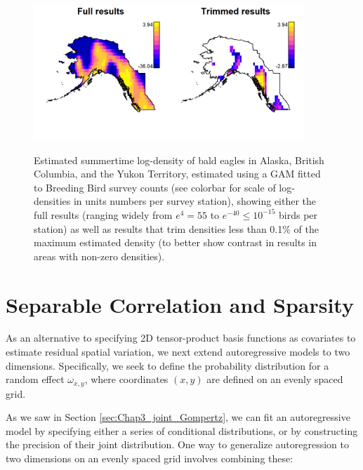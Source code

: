 \begin{figure}[!ht]
    \caption[GAM estimates of bald eagle densities]{Estimated summertime log-density of bald eagles in Alaska, British Columbia, and the Yukon Territory, estimated using a GAM fitted to Breeding Bird survey counts (see colorbar for scale of log-densities in units numbers per survey station), showing either the full results (ranging widely from \(e^4=55\) to \(e^{-40} \leq 10^{-15}\) birds per station) as well as results that trim densities less than 0.1\% of the maximum estimated density (to better show contrast in results in areas with non-zero densities).}
    \centering
    \includegraphics[width=4in]{Chap_5/Mapped_GAM.png}
    \label{fig:Chap5_GAM}
\end{figure}

\section{Separable Correlation and Sparsity} \label{sec:Chap5_separable_correlation}

As an alternative to specifying 2D tensor-product basis functions as covariates to estimate residual spatial variation, we next extend autoregressive models to two dimensions.  Specifically, we seek to define the probability distribution for a random effect \(\omega_{x,y}\), where coordinates \((x,y)\) are defined on an evenly spaced grid.

As we saw in Section \ref{sec:Chap3_joint_Gompertz}, we can fit an autoregressive model by specifying either a series of conditional distributions, or by constructing the precision of their joint distribution.  One way to generalize autoregression to two dimensions on an evenly spaced grid involves combining these:

